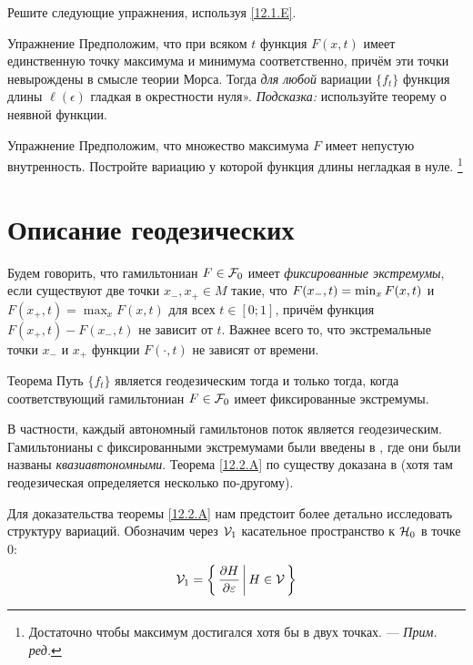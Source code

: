 Решите следующие упражнения, используя \ref{12.1.E}.

\begin{ex}{Упражнение}\label{12.1.F}
Предположим, что при всяком $t$ функция $F(x, t)$ имеет единственную
точку максимума и минимума соответственно, причём эти точки
невырождены в смысле теории Морса. 
Тогда \textit{для любой} вариации $\{f_t\}$ функция длины $\ell(\epsilon)$ гладкая в окрестности нуля». 
\emph{Подсказка:} используйте теорему о неявной функции.
\end{ex}

\begin{ex}{Упражнение}\label{12.1.G}
Предположим, что множество максимума $F$ имеет непустую внутренность.
Постройте вариацию у которой функция длины негладкая в нуле.%
\footnote{Достаточно чтобы максимум достигался хотя бы в двух точках. --- \textit{Прим. ред.}}
\end{ex}

\section{Описание геодезических}\label{sec:12.2}

Будем говорить, что гамильтониан $F\in \mathcal{F}_0$ имеет \emph{фиксированные экстремумы}, если существуют две точки $x_-, x_+\in M$ такие, что $F(x_-, t) \z= \min_x F(x, t)$ и $F(x_+, t) = \max_x F (x, t)$ для всех $t\in[0; 1]$, причём функция $F(x_+, t) - F(x_-, t)$ не зависит от $t$.
Важнее всего то, что экстремальные точки $x_-$ и $x_+$ функции $F(\cdot, t)$ не зависят от времени.

\begin{thm}{Теорема}\label{12.2.A}
Путь $\{f_t\}$ является геодезическим тогда и только тогда, когда соответствующий гамильтониан $F\in\mathcal{F}_0$ имеет фиксированные экстремумы.
\end{thm}

В частности, каждый автономный гамильтонов поток является геодезическим.
Гамильтонианы с фиксированными экстремумами были введены в \cite{BP1}, где они были названы \emph{квазиавтономными}.
Теорема \ref{12.2.A} по существу доказана в \cite{LM2} (хотя там геодезическая определяется несколько по-другому).

Для доказательства теоремы \ref{12.2.A} нам предстоит более детально исследовать структуру вариаций.
Обозначим через $\mathcal{V}_1$ касательное пространство к $\mathcal{H}_0$ в точке $0$: 
\[\mathcal{V}_1=\left\{ \,{\frac{\partial H}{\partial\varepsilon}}\, \middle| \,{H\in \mathcal{V}}\, \right\}\]


